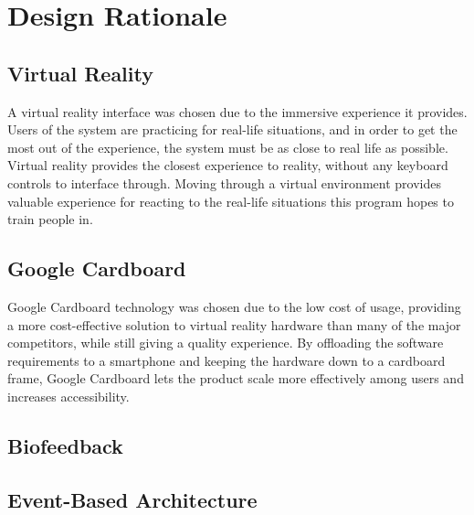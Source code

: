\chapter{Design Rationale}

\section{Virtual Reality}
    A virtual reality interface was chosen due to the immersive experience it provides. Users of the system are practicing for real-life situations, and in order to get the most out of the experience, the system must be as close to real life as possible. Virtual reality provides the closest experience to reality, without any keyboard controls to interface through. Moving through a virtual environment provides valuable experience for reacting to the real-life situations this program hopes to train people in.
\section{Google Cardboard}
    Google Cardboard technology was chosen due to the low cost of usage, providing a more cost-effective solution to virtual reality hardware than many of the major competitors, while still giving a quality experience. By offloading the software requirements to a smartphone and keeping the hardware down to a cardboard frame, Google Cardboard lets the product scale more effectively among users and increases accessibility.
\section{Biofeedback}

\section{Event-Based Architecture}